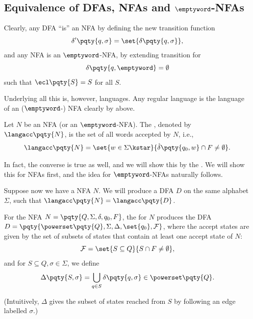 \subsection{Equivalence of DFAs, NFAs and \(\emptyword\)-NFAs}

Clearly, any DFA ``is'' an NFA by defining the new transition function
\[
    \delta'\pqty{q, \sigma} = \set{\delta\pqty{q, \sigma}},
\]
and any NFA is an \(\emptyword\)-NFA, by extending transition for
\[
    \delta\pqty{q, \emptyword} = \emptyset
\]
such that \(\ecl\pqty{S} = S\) for all \(S\).

Underlying all this is, however, languages. Any regular language is the language of an (\(\emptyword\)-) NFA clearly by above.

\begin{definition}
    Let \(N\) be an NFA (or an \(\emptyword\)-NFA). The , denoted by \(\langacc\pqty{N}\), is the set of all words accepted by \(N\), i.e.,
    \[
        \langacc\pqty{N} = \set{w \in \Sigma\kstar}{\hat{\delta}\pqty{q_0, w} \cap F \neq \emptyset}.
    \]
\end{definition}

In fact, the converse is true as well, and we will show this by the . We will show this for NFAs first, and the idea for \(\emptyword\)-NFAs naturally follows.

Suppose now we have a NFA \(N\). We will produce a DFA \(D\) on the same alphabet \(\Sigma\), such that \(\langacc\pqty{N} = \langacc\pqty{D}\).

\begin{definition}
    \label{def:subset-construction}%
    For the NFA \(N = \pqty{Q, \Sigma, \delta, q_0, F}\), the  for \(N\) produces the DFA \(D = \pqty{\powerset\pqty{Q}, \Sigma, \Delta, \set{q_0}, \mathcal{F}}\), where the accept states are given by the set of subsets of states that contain at least one accept state of \(N\):
    \[
        \mathcal{F} = \set{S \subseteq Q}{S \cap F \neq \emptyset},
    \]
    and for \(S \subseteq Q, \sigma \in \Sigma\), we define
    \[
        \Delta\pqty{S, \sigma} = \bigcup_{q \in S} \delta\pqty{q, \sigma} \in \powerset\pqty{Q}.
    \]

    (Intuitively, \(\Delta\) gives the subset of states reached from \(S\) by following an edge labelled \(\sigma\).)
\end{definition}

